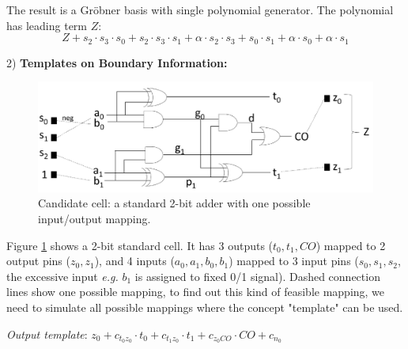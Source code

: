 The result is a Gr\"obner basis with single polynomial generator. The polynomial has leading term $Z$:
$$Z+s_2\cdot s_3\cdot s_0+s_2\cdot s_3\cdot s_1+\alpha\cdot s_2\cdot s_3+s_0\cdot s_1+\alpha\cdot s_0+\alpha\cdot s_1$$


2) {\bf Templates on Boundary Information:}
\begin{figure}[bp]
	\begin{center}
	\includegraphics[width=\textwidth]{newfig/template.pdf}
	\end{center}
	\caption{Candidate cell: a standard 2-bit adder with one possible input/output mapping.}
	\label{fig:template}
\end{figure}

Figure \ref{fig:template} shows a 2-bit standard cell. It has 3 outputs ($t_0,t_1,CO$) mapped to 2 output pins ($z_0,z_1$),
and 4 inputs ($a_0,a_1,b_0,b_1$) mapped to 3 input pins ($s_0,s_1,s_2$, the excessive input {\it e.g.} $b_1$ is assigned to fixed 0/1 signal). Dashed connection
lines show one possible mapping, to find out this kind of feasible mapping, we need to simulate
all possible mappings where the concept "template" can be used.

{\it Output template}: $z_0+c_{{t_0}{z_0}}\cdot t_0+c_{t_1z_0}\cdot t_1+c_{z_0CO}\cdot CO+c_{n_0}$

